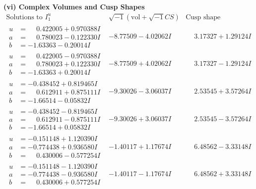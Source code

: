 \documentclass[1p]{elsarticle_modified}
\theoremstyle{definition}
\newcommand{\I}{\sqrt{-1}}
\begin{document}
\newpage\flushleft \textbf{(vi) Complex Volumes and Cusp Shapes}
$$\begin{array}{c|c|c}  
\text{Solutions to }I^u_{1}& \I (\text{vol} + \sqrt{-1}CS) & \text{Cusp shape}\\
 \hline 
\begin{aligned}
u &= \phantom{-}0.422005 + 0.970388 I \\
a &= \phantom{-}0.780023 - 0.122330 I \\
b &= -1.63363 - 0.20014 I\end{aligned}
 & -8.77509 - 4.02062 I & \phantom{-}3.17327 + 1.29124 I \\ \hline\begin{aligned}
u &= \phantom{-}0.422005 - 0.970388 I \\
a &= \phantom{-}0.780023 + 0.122330 I \\
b &= -1.63363 + 0.20014 I\end{aligned}
 & -8.77509 + 4.02062 I & \phantom{-}3.17327 - 1.29124 I \\ \hline\begin{aligned}
u &= -0.438452 + 0.819465 I \\
a &= \phantom{-}0.612911 + 0.875111 I \\
b &= -1.66514 - 0.05832 I\end{aligned}
 & -9.30026 - 3.06037 I & \phantom{-}2.53545 + 3.57264 I \\ \hline\begin{aligned}
u &= -0.438452 - 0.819465 I \\
a &= \phantom{-}0.612911 - 0.875111 I \\
b &= -1.66514 + 0.05832 I\end{aligned}
 & -9.30026 + 3.06037 I & \phantom{-}2.53545 - 3.57264 I \\ \hline\begin{aligned}
u &= -0.151148 + 1.120390 I \\
a &= -0.774438 + 0.936580 I \\
b &= \phantom{-}0.430006 - 0.577254 I\end{aligned}
 & -1.40117 + 1.17674 I & \phantom{-}6.48562 - 3.33148 I \\ \hline\begin{aligned}
u &= -0.151148 - 1.120390 I \\
a &= -0.774438 - 0.936580 I \\
b &= \phantom{-}0.430006 + 0.577254 I\end{aligned}
 & -1.40117 - 1.17674 I & \phantom{-}6.48562 + 3.33148 I \\ \hline\begin{aligned}

\end{aligned}
\end{array}$$
\end{document}
